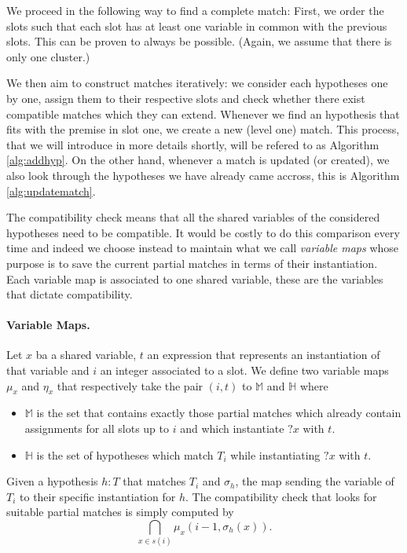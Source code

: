 \documentclass[runningheads]{llncs}
\newcommand{\xcom}[1]{{\color{cyan}{Xavier: #1}} }
\begin{document}
We proceed in the following way to find a complete match:
First, we order the slots such that each slot has at least one variable in common with the previous slots.
This can be proven to always be possible.
(Again, we assume that there is only one cluster.)
\xcom{We can add the proof if we want to / have space.}

We then aim to construct matches iteratively: we consider each hypotheses one by one, assign them to their respective slots and check whether there exist compatible matches which they can extend.
Whenever we find an hypothesis that fits with the premise in slot one, we create a new (level one) match.
This process, that we will introduce in more details shortly, will be refered to as Algorithm \ref{alg:addhyp}.
On the other hand, whenever a match is updated (or created), we also look through the hypotheses we have already came accross, this is Algorithm \ref{alg:updatematch}.

The compatibility check means that all the shared variables of the considered hypotheses need to be compatible.
It would be costly to do this comparison every time and indeed we choose instead to maintain what we call \textit{variable maps} whose purpose is to save the current partial matches in terms of their instantiation.
Each variable map is associated to one shared variable, these are the variables that dictate compatibility.

\paragraph{Variable Maps.}
Let $x$ ba a shared variable, $t$ an expression that represents an instantiation of that variable and $i$ an integer associated to a slot.
We define two variable maps $\mu_x$ and $\eta_x$ that respectively take the pair $(i,t)$ to $\mathbb{M}$ and $\mathbb{H}$ where
\begin{itemize}
  \item $\mathbb{M}$ is the set that contains exactly those partial matches which already contain assignments for all slots up to $i$ and which instantiate $?x$ with $t$.
  \item $\mathbb{H}$ is the set of hypotheses which match $T_i$ while instantiating $?x$ with $t$.
\end{itemize}

Given a hypothesis $h : T$ that matches $T_i$ and $\sigma_h$, the map sending the variable of $T_i$ to their specific instantiation for $h$.
The compatibility check that looks for suitable partial matches is simply computed by
\[
  \bigcap_{x \in s(i)} \mu_x \left(i - 1, \sigma_h(x)\right).
\]
\end{document}
